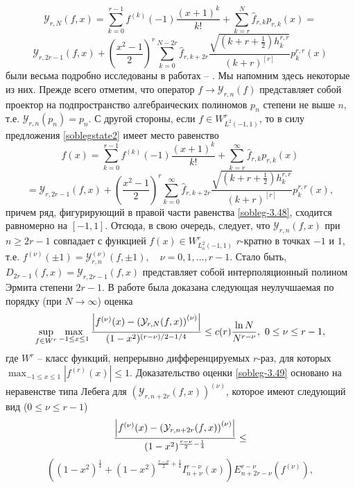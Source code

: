 $$
\mathcal{ Y}_{r,N}(f,x)=\sum_{k=0}^{r-1} f^{(k)}(-1)\frac{(x+1)^k}{k!}+\sum_{k=r}^N \hat f_{r,k}p_{r,k}(x)=
$$
\begin{equation}\label{sobleg-3.47}
\mathcal{ Y}_{r,2r-1}(f,x)+\left(\frac{x^2-1}2\right)^r\sum_{k=0}^{N-2r}\hat f_{r,k+2r} \frac{\sqrt{(k+r+\frac12)h_k^{r,r}}}{ (k+r)^{[r]}}p_{k}^{r,r}(x)
\end{equation}
 были весьма подробно исследованы в работах \cite{Shar11} -- \cite{sharap3}. Мы напомним здесь некоторые из них. Прежде всего отметим, что оператор  $f\to \mathcal{ Y}_{r,n}(f)$ представляет собой проектор на подпространство алгебраических полиномов $p_n$ степени не выше $n$, т.е. $\mathcal{ Y}_{r,n}(p_n)=p_n$. С другой стороны, если $f\in W^r_{L^2(-1,1)}$, то в силу предложения \ref{soblegstate2} имеет место равенство
$$
f(x)=\sum_{k=0}^{r-1} f^{(k)}(-1)\frac{(x+1)^k}{k!}+\sum_{k=r}^\infty \hat f_{r,k}p_{r,k}(x)
$$
\begin{equation}\label{sobleg-3.48}
=\mathcal{ Y}_{r,2r-1}(f,x)+\left(\frac{x^2-1}2\right)^r\sum_{k=0}^\infty\hat f_{r,k+2r} \frac{\sqrt{(k+r+\frac12)h_k^{r,r}}}{ (k+r)^{[r]}}p_{k}^{r,r}(x),
\end{equation}
причем ряд, фигурирующий в правой части равенства \eqref{sobleg-3.48}, сходится равномерно на $[-1,1]$. Отсюда, в свою очередь, следует, что   $\mathcal{ Y}_{r,n}(f,x)$ при $n\ge2r-1 $ совпадает с функцией $f(x)\in W^r_{L^2_\kappa(-1,1)}$ $r$-кратно в точках $-1$ и $1$, т.е. $f^{(\nu)}(\pm1)=\mathcal{ Y}_{r,n}^{(\nu)}(f,\pm1),\quad \nu=0,1,\ldots, r-1$. Стало быть,
 $D_{2r-1}(f,x)=\mathcal{ Y}_{r,2r-1}(f,x)$
представляет собой \cite{Shar17} интерполяционный полином Эрмита степени $2r-1$.
В работе \cite{Shar15}  была доказана следующая неулучшаемая по порядку (при $N\to\infty$) оценка
\begin{equation}\label{sobleg-3.49}
\sup_{f\in W^r}\max_{-1\le x\le 1}{\left|f^{(\nu)}(x)-\left(\mathcal{ Y}_{r,N}(f,x)\right)^{(\nu)}\right|\over(1-x^2)^{(r-\nu)/2-1/4}}
\le c(r)\frac{\ln N}{N^{r-\nu}},\,\, 0\le \nu\le r-1,
\end{equation}
 где  $W^r$ -- класс функций, непрерывно дифференцируемых $r$-раз, для которых $\max_{-1\le x\le 1}|f^{(r)}(x)|\le1$.
Доказательство оценки \eqref{sobleg-3.49}  основано \cite{Shar15} на неравенстве типа Лебега для $(\mathcal{ Y}_{r,n+2r}(f,x))^{(\nu)}$, которое имеют следующий вид ($0\le\nu\le r-1$)
$$
{\left|f^{(\nu)}(x)-\left(\mathcal{ Y}_{r,n+2r}(f,x)\right)^{(\nu)}\right|
\over(1-x^2)^{\frac{r-\nu}{2}-\frac14}}\le
$$
  \begin{equation}\label{sobleg-3.50}
    ((1-x^2)^\frac14+(1-x^2)^{\frac{r-\nu}{2}+\frac14}I^{r-\nu}_{n+\nu}(x))
E^{r-\nu}_{n+2r-\nu}(f^{(\nu)}),
\end{equation}
